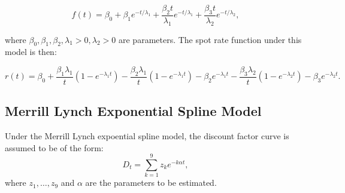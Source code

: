 \begin{equation}
  f(t) = \beta_0 + \beta_1 e^{-t/\lambda_1} 
         + \frac{\beta_2 t}{\lambda_1} e^{-t/\lambda_1}
         + \frac{\beta_3 t}{\lambda_2} e^{-t/\lambda_2},
\end{equation}

where $\beta_0,\beta_1,\beta_2,\lambda_1>0, \lambda_2>0$ are parameters. The 
spot rate function under this model is then:

\begin{equation}
  r(t) = \beta_0 + \frac{\beta_1 \lambda_1}{t} \left(1- e^{-\lambda_1 t} \right)
         - \frac{\beta_2 \lambda_1}{t} \left(1- e^{-\lambda_1 t} \right)
         - \beta_2 e^{-\lambda_1 t}
         - \frac{\beta_3 \lambda_2}{t} \left(1- e^{-\lambda_2 t} \right)
         - \beta_3 e^{-\lambda_2 t}.
\end{equation}

\subsection{Merrill Lynch Exponential Spline Model}

Under the Merrill Lynch expoential spline model, the discount factor curve is
assumed to be of the form:
\begin{equation}
  D_t = \sum_{k=1}^9 z_k e^{-k\alpha t },
\end{equation}
where $z_1,\dots,z_9$ and $\alpha$ are the parameters to be estimated.

